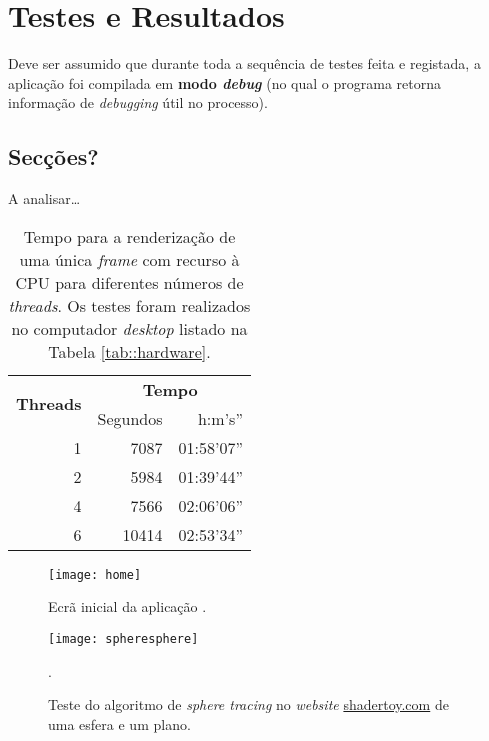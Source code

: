 \chapter{Testes e Resultados}
\label{ch::testes}

Deve ser assumido que durante toda a sequência de testes feita e registada, a aplicação foi compilada em \textbf{modo \textit{debug}} (no qual o programa retorna informação de \textit{debugging} útil no processo).

\section{Secções?}
A analisar\ldots


\begin{table}[!htbp]
	\centering
	\caption[Tempos de renderização em \acs{CPU}]{Tempo para a renderização de uma única \textit{frame} com recurso à \acs{CPU} para diferentes números de \textit{threads}. Os testes foram realizados no computador \textit{desktop} listado na Tabela \ref{tab::hardware}.}
	\label{tab::render_cpu}
	\begin{tabular}{r r r}
		\toprule
		\multirow{2}{*}{\textbf{Threads}} & \multicolumn{2}{c}{\textbf{Tempo}} \\
		\cline{2-3}
		 & Segundos & h:m's'' \\
		\midrule
		1 &  7087 & 01:58'07'' \\
		2 &  5984 & 01:39'44'' \\
		4 &  7566 & 02:06'06'' \\
		6 & 10414 & 02:53'34'' \\
		\bottomrule
	\end{tabular}
\end{table}


\begin{figure}[!htbp]
	\centering
	\texttt{[image: home]}
	\caption[Ecrã inicial da aplicação]{Ecrã inicial da aplicação \theapp.}
	\label{fig::home}
\end{figure}

\begin{figure}[!htbp]
	\centering
	\texttt{[image: spheresphere]}
	\caption[Teste do algoritmo de \textit{sphere tracing}]{Teste do algoritmo de \textit{sphere tracing} no \textit{website} \url{shadertoy.com} de uma esfera e um plano.}.
	\label{fig::spheresphere}
\end{figure}


